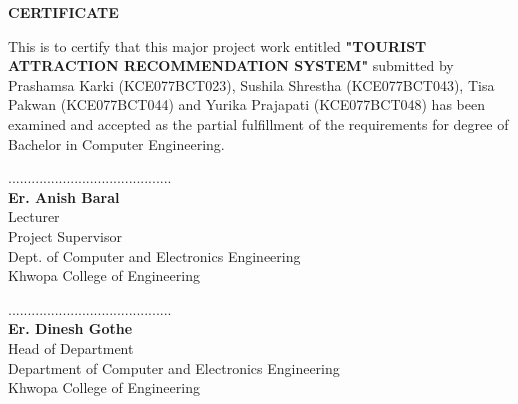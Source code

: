 
\vspace*{1in}

\begin{center}
    \large{\textbf{CERTIFICATE}}
\end{center}

\vspace{1cm}

\noindent This is to certify that this major project work entitled \textbf{"TOURIST ATTRACTION RECOMMENDATION SYSTEM"} submitted by Prashamsa Karki (KCE077BCT023), Sushila Shrestha (KCE077BCT043), Tisa Pakwan (KCE077BCT044) and Yurika Prajapati (KCE077BCT048) has been examined and accepted as the partial fulfillment of the requirements for degree of Bachelor in Computer Engineering.

\vspace{1in}

\begin{minipage}{0.45\textwidth}
    \begin{center}
        ..........................................\\[0.5em]
        \textbf{Er. Anish Baral}\\
        Lecturer\\
        Project Supervisor\\
        Dept. of Computer and Electronics Engineering\\
        Khwopa College of Engineering
    \end{center}
\end{minipage}
\hfill
\begin{minipage}{0.45\textwidth}
    \begin{center}
        ..........................................\\[0.5em]
        \textbf{Er. Dinesh Gothe}\\
        Head of Department\\
        Department of Computer and Electronics Engineering\\
        Khwopa College of Engineering
    \end{center}
\end{minipage}
